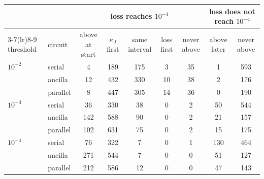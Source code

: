\begin{tabular}{llccccccc}\toprule
 & & \multicolumn{5}{c}{loss reaches $10^{-4}$} & \multicolumn{2}{c}{loss does not reach $10^{-4}$} \\\cmidrule(lr){3-7}\cmidrule(lr){8-9}
threshold & circuit & above at start & $\kappa_J$ first & same interval & loss first & never above & above later & never above \\\midrule
$10^{-2}$ & serial & 4 & 189 & 175 & 3 & 35 & 1 & 593 \\
 & ancilla & 12 & 432 & 330 & 10 & 38 & 2 & 176 \\
 & parallel & 8 & 447 & 305 & 14 & 36 & 0 & 190 \\
\midrule
$10^{-3}$ & serial & 36 & 330 & 38 & 0 & 2 & 50 & 544 \\
 & ancilla & 142 & 588 & 90 & 0 & 2 & 21 & 157 \\
 & parallel & 102 & 631 & 75 & 0 & 2 & 15 & 175 \\
\midrule
$10^{-4}$ & serial & 76 & 322 & 7 & 0 & 1 & 130 & 464 \\
 & ancilla & 271 & 544 & 7 & 0 & 0 & 51 & 127 \\
 & parallel & 212 & 586 & 12 & 0 & 0 & 47 & 143 \\
\bottomrule
\end{tabular}
